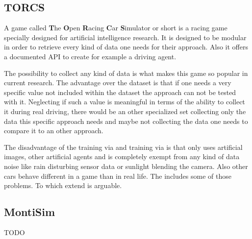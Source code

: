 \subsection{TORCS} \label{subsec: TORCS}

A game called \textbf{T}he \textbf{O}pen \textbf{R}acing \textbf{C}ar \textbf{S}imulator or short \torcs is a racing game specially designed for artificial intelligence research. It is designed to be modular in order to retrieve every kind of data one needs for their approach. Also it offers a documented API to create for example a driving agent. 

The possibility to collect any kind of data is what makes this game so popular in current research. The advantage over the \kitti dataset is that if one needs a very specific value not included within the \kitti dataset the approach can not be tested with it. Neglecting if such a value is meaningful in terms of the ability to collect it during real driving, there would be an other specialized set collecting only the data this specific approach needs and maybe not collecting the data one needs to compare it to an other approach.

The disadvantage of the training via \torcs and training via \kitti is that \torcs only uses artificial images, other artificial agents and is completely exempt from any kind of data noise like rain disturbing sensor data or sunlight blending the camera. Also other cars behave different in a game than in real life. The \kitti includes some of those problems. To which extend is arguable. \cite{wymann2000torcs}

\subsection{MontiSim} \label{subsec: MontiSim}

TODO